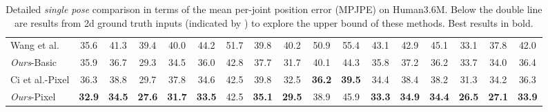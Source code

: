 \documentclass[runningheads]{llncs}
\begin{document}
\begin{table*}
\begin{center}
{\begin{tabular}{ l c c c c c c c c c c c c c c c c }
Wang et al. \cite{wang2019generalizing}& 35.6 &41.3 &39.4 &40.0 &44.2 &51.7 &39.8 &40.2 &50.9 &55.4 &43.1 &42.9 &45.1 &33.1 &37.8 &42.0\\
\emph{Ours}-Basic  &35.9&36.7&29.3&34.5&36.0&42.8&37.7&31.7&40.1&44.3&35.8&37.2&36.2&33.7&34.0&36.4\\
Ci et al.-Pixel \cite{ci2019optimizing} &36.3& 38.8 &29.7& 37.8& 34.6& 42.5& 39.8& 32.5& \textbf{36.2}& \textbf{39.5}& 34.4& 38.4& 38.2& 31.3& 34.2&36.3\\
\emph{Ours}-Pixel &\textbf{32.9}&\textbf{34.5}&\textbf{27.6}&\textbf{31.7}&\textbf{33.5}&42.5&\textbf{35.1}&\textbf{29.5}&38.9&45.9&\textbf{33.3}&\textbf{34.9}&\textbf{34.4}&\textbf{26.5}&\textbf{27.1}&\textbf{33.9}\\
\hline
\end{tabular}}
\end{center}
\caption{Detailed \emph{single pose} comparison in terms of the mean per-joint position error (MPJPE) on Human3.6M. Below the double line are results from 2d ground truth inputs (indicated by ) to explore the upper bound of these methods. Best results in bold. }
\label{tab:human_p1_single}
\end{table*}
\end{document}
